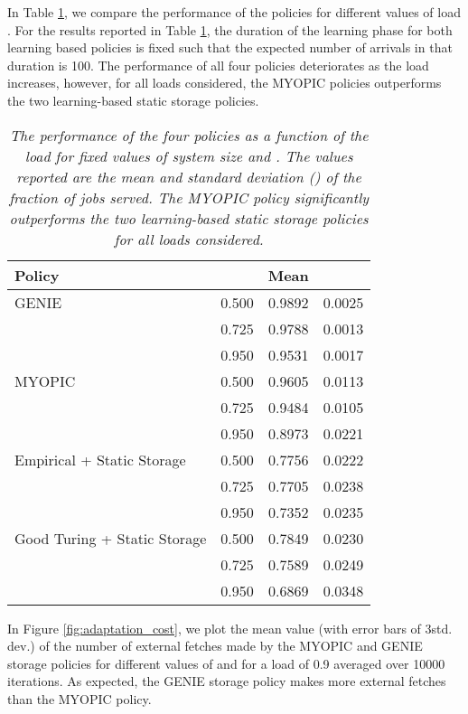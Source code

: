 \documentclass[10pt, conference, letterpaper]{IEEEtran}
\begin{document}
In Table \ref{table:diff_load}, we compare the performance of the policies for different values of load . For the results reported in Table \ref{table:diff_load}, the duration of the learning phase for both learning based policies is fixed such that the expected number of arrivals in that duration is 100. The performance of all four policies deteriorates as the load increases, however, for all loads considered, the MYOPIC policies outperforms the two learning-based static storage policies.

\begin{table}[h]
	\centering
	\begin{tabular}{l c c c }
		\hline\hline
		Policy &  & Mean &  \\ [0.5ex] \hline GENIE & 0.500 & 0.9892 & 0.0025 \\
		& 0.725 & 0.9788 & 0.0013 \\
		& 0.950 & 0.9531 & 0.0017 \\
		\hline
		MYOPIC & 0.500 & 0.9605 & 0.0113 \\
		& 0.725 & 0.9484 & 0.0105 \\
		& 0.950 & 0.8973 & 0.0221 \\
		\hline
		Empirical + Static Storage & 0.500 & 0.7756 & 0.0222  \\
		& 0.725 & 0.7705 & 0.0238 \\
		& 0.950 & 0.7352 & 0.0235 \\
		\hline
		Good Turing + Static Storage & 0.500 & 0.7849 & 0.0230  \\
		& 0.725 & 0.7589 & 0.0249 \\
		& 0.950 & 0.6869 & 0.0348 \\
		\hline
	\end{tabular}
	\caption{\sl The performance of the four policies as a function of the load  for fixed values of system size  and . The values reported are the mean and standard deviation () of the fraction of jobs served. The MYOPIC policy significantly outperforms the two learning-based static storage policies for all loads considered.}
	
	\label{table:diff_load} \end{table}


In Figure \ref{fig:adaptation_cost}, we plot the mean value (with error bars of 3std. dev.) of the number of external fetches made by the MYOPIC and GENIE storage policies for different values of  and  for a load of 0.9 averaged over 10000 iterations. As expected, the GENIE storage policy makes more external fetches than the MYOPIC policy.
\end{document}
